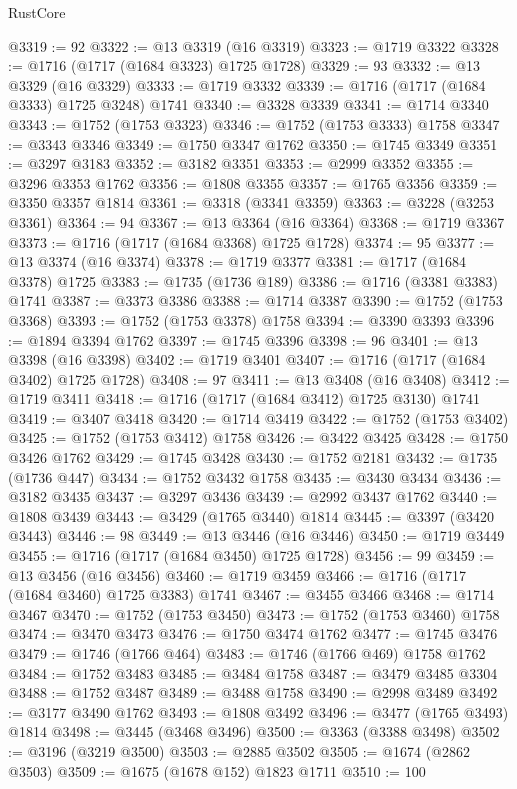 \begin{lexlean}{RustCore}
\begin{coremodule}
@3319 := 92
@3322 := @13 @3319 (@16 @3319)
@3323 := @1719 @3322
@3328 := @1716 (@1717 (@1684 @3323) @1725 @1728)
@3329 := 93
@3332 := @13 @3329 (@16 @3329)
@3333 := @1719 @3332
@3339 := @1716 (@1717 (@1684 @3333) @1725 @3248) @1741
@3340 := @3328 @3339
@3341 := @1714 @3340
@3343 := @1752 (@1753 @3323)
@3346 := @1752 (@1753 @3333) @1758
@3347 := @3343 @3346
@3349 := @1750 @3347 @1762
@3350 := @1745 @3349
@3351 := @3297 @3183
@3352 := @3182 @3351
@3353 := @2999 @3352
@3355 := @3296 @3353 @1762
@3356 := @1808 @3355
@3357 := @1765 @3356
@3359 := @3350 @3357 @1814
@3361 := @3318 (@3341 @3359)
@3363 := @3228 (@3253 @3361)
@3364 := 94
@3367 := @13 @3364 (@16 @3364)
@3368 := @1719 @3367
@3373 := @1716 (@1717 (@1684 @3368) @1725 @1728)
@3374 := 95
@3377 := @13 @3374 (@16 @3374)
@3378 := @1719 @3377
@3381 := @1717 (@1684 @3378) @1725
@3383 := @1735 (@1736 @189)
@3386 := @1716 (@3381 @3383) @1741
@3387 := @3373 @3386
@3388 := @1714 @3387
@3390 := @1752 (@1753 @3368)
@3393 := @1752 (@1753 @3378) @1758
@3394 := @3390 @3393
@3396 := @1894 @3394 @1762
@3397 := @1745 @3396
@3398 := 96
@3401 := @13 @3398 (@16 @3398)
@3402 := @1719 @3401
@3407 := @1716 (@1717 (@1684 @3402) @1725 @1728)
@3408 := 97
@3411 := @13 @3408 (@16 @3408)
@3412 := @1719 @3411
@3418 := @1716 (@1717 (@1684 @3412) @1725 @3130) @1741
@3419 := @3407 @3418
@3420 := @1714 @3419
@3422 := @1752 (@1753 @3402)
@3425 := @1752 (@1753 @3412) @1758
@3426 := @3422 @3425
@3428 := @1750 @3426 @1762
@3429 := @1745 @3428
@3430 := @1752 @2181
@3432 := @1735 (@1736 @447)
@3434 := @1752 @3432 @1758
@3435 := @3430 @3434
@3436 := @3182 @3435
@3437 := @3297 @3436
@3439 := @2992 @3437 @1762
@3440 := @1808 @3439
@3443 := @3429 (@1765 @3440) @1814
@3445 := @3397 (@3420 @3443)
@3446 := 98
@3449 := @13 @3446 (@16 @3446)
@3450 := @1719 @3449
@3455 := @1716 (@1717 (@1684 @3450) @1725 @1728)
@3456 := 99
@3459 := @13 @3456 (@16 @3456)
@3460 := @1719 @3459
@3466 := @1716 (@1717 (@1684 @3460) @1725 @3383) @1741
@3467 := @3455 @3466
@3468 := @1714 @3467
@3470 := @1752 (@1753 @3450)
@3473 := @1752 (@1753 @3460) @1758
@3474 := @3470 @3473
@3476 := @1750 @3474 @1762
@3477 := @1745 @3476
@3479 := @1746 (@1766 @464)
@3483 := @1746 (@1766 @469) @1758 @1762
@3484 := @1752 @3483
@3485 := @3484 @1758
@3487 := @3479 @3485 @3304
@3488 := @1752 @3487
@3489 := @3488 @1758
@3490 := @2998 @3489
@3492 := @3177 @3490 @1762
@3493 := @1808 @3492
@3496 := @3477 (@1765 @3493) @1814
@3498 := @3445 (@3468 @3496)
@3500 := @3363 (@3388 @3498)
@3502 := @3196 (@3219 @3500)
@3503 := @2885 @3502
@3505 := @1674 (@2862 @3503)
@3509 := @1675 (@1678 @152) @1823 @1711
@3510 := 100

\end{coremodule}
\end{lexlean}

